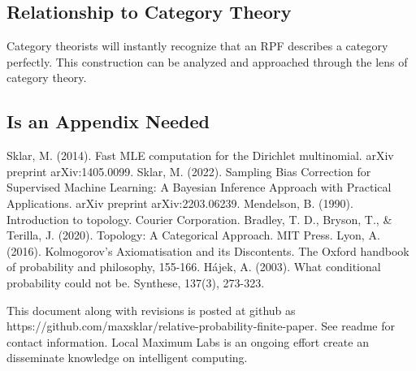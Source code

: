 \documentclass[twoside]{article}
\begin{document}
\subsection{Relationship to Category Theory}
Category theorists will instantly recognize that an RPF describes a category perfectly. This construction can be analyzed and approached through the lens of category theory.

\begin{appendices}

\section{Is an Appendix Needed}

\end{appendices}


\begin{thebibliography}{20}

Sklar, M. (2014). Fast MLE computation for the Dirichlet multinomial. arXiv preprint arXiv:1405.0099.
Sklar, M. (2022). Sampling Bias Correction for Supervised Machine Learning: A Bayesian Inference Approach with Practical Applications. arXiv preprint arXiv:2203.06239.
Mendelson, B. (1990). Introduction to topology. Courier Corporation.
Bradley, T. D., Bryson, T., \& Terilla, J. (2020). Topology: A Categorical Approach. MIT Press.
Lyon, A. (2016). Kolmogorov’s Axiomatisation and its Discontents. The Oxford handbook of probability and philosophy, 155-166.
Hájek, A. (2003). What conditional probability could not be. Synthese, 137(3), 273-323.

\end{thebibliography}

This document along with revisions is posted at github as https://github.com/maxsklar/relative-probability-finite-paper. See readme for contact information. Local Maximum Labs is an ongoing effort create an disseminate knowledge on intelligent computing.
\end{document}
